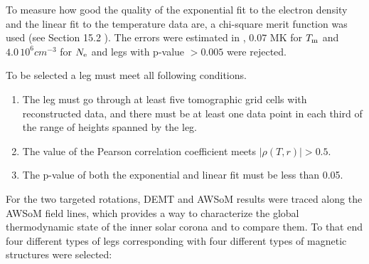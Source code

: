 \documentclass[namedreferences]{solarphysics}
\newcommand{\Tm}{T_{\rm m}}
\newcommand{\Ne}{N_{\rm e}}
\newcommand{\rhoTr}{\rho(T,r)}
\def\temp#1{\textcolor{gray}{#1}}
\begin{document}
\begin{article}
To measure how good the quality of the exponential fit to the electron density and the linear fit to the temperature data are, a chi-square merit function was used (see Section 15.2 \citet{recipes}). The errors were estimated in \citet{lloveras_2017}, $0.07$ MK for $\Tm$ and $4.0\,10^6 cm^{-3}$ for $\Ne$ and legs with p-value $>0.005$ were rejected. 



{To be selected a leg must meet all following conditions.}

\begin{enumerate}

\item 
The leg must go through at least five tomographic grid cells with reconstructed data, and there must be at least one data point in each third of the range of heights spanned by the leg.

\item 
The {value of the Pearson correlation coefficient meets $|\rhoTr| > 0.5$.}

\item 
The p-value of both the exponential and linear fit must be less than 0.05.

\end{enumerate}


For the two targeted rotations, DEMT and AWSoM results were traced along the AWSoM field lines, which provides a way to characterize the global thermodynamic state of the inner solar corona and to compare them. To that end four different types of {legs} corresponding with four different types of magnetic structures were selected:


\end{article}
\end{document}
